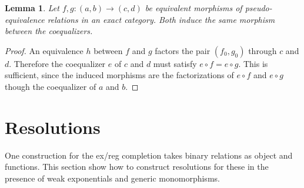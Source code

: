 \documentclass[sort&compress,draft]{elsarticle}
\theoremstyle{plain}
\newtheorem{lemma}[theorem]{Lemma}
\theoremstyle{definition}
\theoremstyle{remark}
\newcommand\hide[1]{}
\newcommand\cat\mathcal
\newcommand\of:
\newcommand\id{\mathrm{id}}
\newcommand\cod{\mathrm{cod}}
\newcommand\di{_!}
\begin{document}
\begin{lemma} Let $f,g\of(a,b)\to(c,d)$ be equivalent morphisms of pseudo-e\-qui\-va\-len\-ce relations in an exact category. Both induce the same morphism between the coequalizers. \label{equivalence implies equality} \end{lemma}

\begin{proof} An equivalence $h$ between $f$ and $g$ factors the pair $(f_0,g_0)$ through $c$ and $d$. Therefore the coequalizer $e$ of $c$ and $d$ must satisfy $e\circ f=e\circ g$. This is sufficient, since the induced morphisms are the factorizations of $e \circ f$ and $e\circ g$ though the coequalizer of $a$ and $b$.
\end{proof}


\hide{\begin{lemma} Let $F\of\cat C\to\cat D$ be a finite limit preserving fully faithful between categories with finite limits and let $\cat D$ be exact. If for each exact $\cat E$ each finite limit preserving functor $G\of\cat C\to\cat E$ has a finite limit preserving left Kan extension $F\di(G)$ along $F$ then $F$ is resolvent. \label{left to resolvent}\end{lemma}

\begin{proof} Define $\cat E$ as follows. Objects are regular epimorphisms $FX\to Y$ in $\cat D$. A morphism $e\to e'$ is a morphism $f\of\cod(e)\to\cod(e')$
such that $f\circ e$ factors through $e'$. This category $\cat E$ is easily proved exact. Let $G\of \cat C\to\cat E$ map $X$ to $\id_{FX}$. This functor preserves finite limits. Any left Kan extension $F\di(G)$ sends each object $D$ of $\cat D$ to a resolvent embedding. Therefore $F$ is resolvent.
\end{proof}}

\hide{ The intuition is equational and essentially algebraic logic. Finite limit preserving functors preserve these.}

\section{Resolutions}
\newcommand\sub{\mathrm{sub}}
\newcommand\tuple[1]{\langle #1 \rangle}
One construction for the ex/reg completion takes binary relations as object and functions. This section show how to construct resolutions for these in the presence of weak exponentials and generic monomorphisms.
\end{document}

